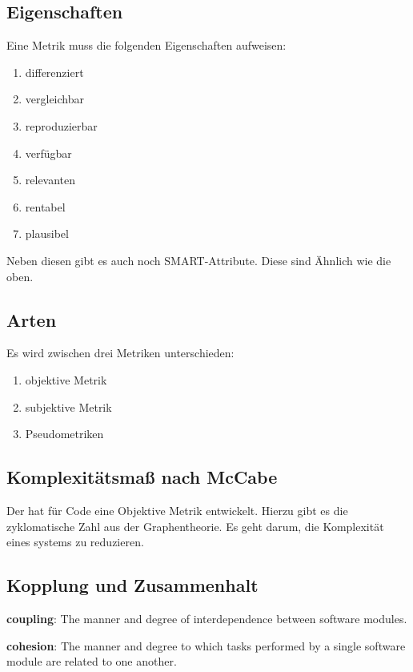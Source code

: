 \documentclass[a4paper]{article}
\begin{document}
\subsection{Eigenschaften}

Eine Metrik muss die folgenden Eigenschaften aufweisen:

\begin{enumerate}
    \item differenziert
    \item vergleichbar
    \item reproduzierbar
    \item verfügbar
    \item relevanten
    \item rentabel
    \item plausibel
\end{enumerate}

Neben diesen gibt es auch noch SMART-Attribute. Diese sind Ähnlich wie die oben.

\subsection{Arten}

Es wird zwischen drei Metriken unterschieden:

\begin{enumerate}
    \item objektive Metrik
    \item subjektive Metrik
    \item Pseudometriken
\end{enumerate}

\subsection{Komplexitätsmaß nach McCabe}

Der hat für Code eine Objektive Metrik entwickelt. Hierzu gibt es die zyklomatische Zahl aus der Graphentheorie. Es geht darum, die Komplexität eines systems zu reduzieren.

\subsection{Kopplung und Zusammenhalt}

\textbf{coupling}: The manner and degree of interdependence between software modules.

\textbf{cohesion}: The manner and degree to which tasks performed by a single software module are related to one another.
\end{document}
